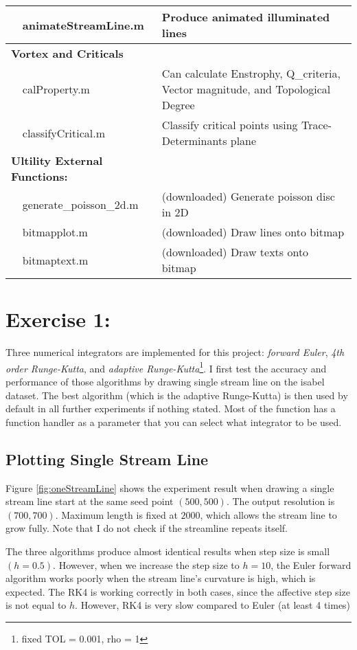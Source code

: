 \documentclass[10pt,a4paper]{article}
\begin{document}
\begin{tabular}{p{0.05cm} p{5cm}|p{10cm}}
			   & animateStreamLine.m & Produce animated illuminated lines\\
		\hline \multicolumn{2}{l|}{\bf{Vortex and Criticals}} & \\ 
		\hline
				& calProperty.m & Can calculate Enstrophy, Q\_criteria, Vector magnitude, and Topological Degree\\
				& classifyCritical.m & Classify critical points using Trace-Determinants plane\\
		\hline \multicolumn{2}{l|}{\bf{Ultility External Functions:}} & \\ 
		\hline
				& generate\_poisson\_2d.m & (downloaded) Generate poisson disc in 2D\\
				& bitmapplot.m & (downloaded) Draw lines onto bitmap\\
				& bitmaptext.m & (downloaded) Draw texts onto bitmap\\

	\end{tabular} 
	\section{Exercise 1:}
		Three numerical integrators are implemented for this project: \emph{forward Euler}, \emph{4th order Runge-Kutta}, and \emph{adaptive Runge-Kutta}\footnote{fixed TOL = 0.001, rho = 1}. I first test the accuracy and performance of those algorithms by drawing single stream line on the isabel dataset. The best algorithm (which is the adaptive Runge-Kutta) is then used by default in all further experiments if nothing stated. Most of the function has a function handler as a parameter that you can select what integrator to be used.
		\subsection{Plotting Single Stream Line}
		Figure \ref{fig:oneStreamLine} shows the experiment result when drawing a single stream line start at the same seed point $(500, 500)$. The output resolution is $(700, 700)$. Maximum length is fixed at $2000$, which allows the stream line to grow fully. Note that I do not check if the streamline repeats itself.
		
		The three algorithms produce almost identical results when step size is small $(h = 0.5)$. However, when we increase the step size to $h = 10$, the Euler forward algorithm works poorly when the stream line's curvature is high, which is expected. The RK4 is working correctly in both cases, since the affective step size is not equal to $h$. However, RK4 is very slow compared to Euler (at least 4 times)
		
\end{document}
